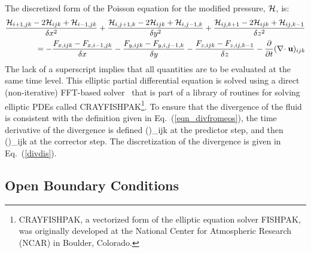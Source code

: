 The discretized form of the
Poisson equation for the modified pressure, ${\cal H}$, is:
\begin{eqnarray}
\frac{{\cal H}_{i+1,jk}-2{\cal H}_{ijk}+{\cal H}_{i-1,jk}}{\delta x^2} +
\frac{{\cal H}_{i,j+1,k}-2{\cal H}_{ijk}+{\cal H}_{i,j-1,k}}{\delta y^2} +
\frac{{\cal H}_{ij,k+1}-2{\cal H}_{ijk}+{\cal H}_{ij,k-1}}{\delta z^2} \nonumber \\ =
    -\frac{F_{x,ijk} - F_{x,i-1,jk}}{\delta x}
    -\frac{F_{y,ijk} - F_{y,i,j-1,k}}{\delta y}
    -\frac{F_{z,ijk} - F_{z,ij,k-1}}{\delta z} - \frac{\partial  }{\partial t}(\nabla\!\cdot {\bf u})_{ijk}
\end{eqnarray}
The lack of a superscript implies that all quantities are to be
evaluated at the same time level.
This elliptic partial differential equation is solved using a direct
(non-iterative) FFT-based solver~\cite{Sweet:1} that is part of a library of routines
for solving elliptic PDEs called CRAYFISHPAK\footnote{CRAYFISHPAK, a vectorized form of the
elliptic equation solver FISHPAK, was originally developed at the National Center for Atmospheric
Research (NCAR) in Boulder, Colorado.}.
To ensure that the divergence of the fluid is consistent with the definition
given in Eq.~(\ref{eqn_divfromeos}), the time derivative of the divergence is defined
\be {}(\nabla\!\cdot \bu)_{ijk} \equiv
           \ee
at the predictor step, and then
\be {}(\nabla\!\cdot \bu)_{ijk} \equiv
          \ee
at the corrector step. The discretization of the divergence is
given in Eq.~(\ref{divdis}).


\subsection{Open Boundary Conditions}

